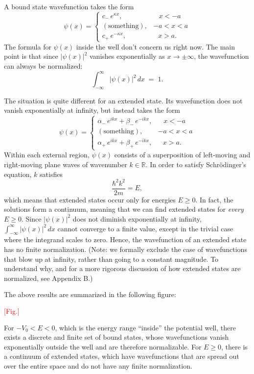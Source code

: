 \documentclass[pra,11pt]{revtex4}
\begin{document}
A bound state wavefunction takes the form
$$\psi(x) = \begin{cases} c_-\, e^{\kappa x}, & \;\;\;x < -a\\ (\mathrm{something}) , & -a < x < a\\ c_+\, e^{-\kappa x} , & \;\;\,x > a.\end{cases}$$
The formula for $\psi(x)$ inside the well don't concern us right now.
The main point is that since $|\psi(x)|^2$ vanishes exponentially as
$x \rightarrow \pm \infty$, the wavefunction can always be
normalized:
$$\int_{-\infty}^\infty |\psi(x)|^2\, dx\; =\; 1.$$

The situation is quite different for an extended state.  Its
wavefunction does not vanish exponentially at infinity, but instead
takes the form
$$\psi(x) = \begin{cases} \alpha_-\, e^{ik x} + \beta_-\, e^{-ik x}, & \;\;\;x < -a\\ (\mathrm{something}) , & -a < x < a\\ \alpha_+\, e^{ik x} + \beta_+\, e^{-ik x} , & \;\;\,x > a.\end{cases}$$
Within each external region, $\psi(x)$ consists of a superposition of
left-moving and right-moving plane waves of wavenumber $k \in
\mathbb{R}$.  In order to satisfy Schr\"odinger's equation, $k$
satisfies
$$\frac{\hbar^2k^2}{2m} = E,$$
which means that extended states occur only for energies $E \ge 0$.
In fact, the solutions form a continuum, meaning that we can find
extended states for \textit{every} $E \ge 0$.  Since $|\psi(x)|^2$
does not diminish exponentially at infinity, $\int_{-\infty}^\infty
|\psi(x)|^2\, dx$ cannot converge to a finite value, except in the
trivial case where the integrand scales to zero.  Hence, the
wavefunction of an extended state has no finite normalization.  (Note:
we formally exclude the case of wavefunctions that blow up at
infinity, rather than going to a constant magnitude.  To understand
why, and for a more rigorous discussion of how extended states are
normalized, see Appendix B.)

The above results are summarized in the following figure:

\textcolor{red}{[Fig.]}

For $-V_0 < E < 0$, which is the energy range ``inside'' the potential
well, there exists a discrete and finite set of bound states, whose
wavefunctions vanish exponentially outside the well and are therefore
normalizable.  For $E \ge 0$, there is a continuum of extended states,
which have wavefunctions that are spread out over the entire space and
do not have any finite normalization.
\end{document}
